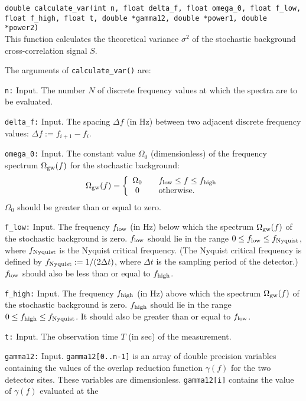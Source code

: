 {\tt double calculate\_var(int n, float delta\_f, float omega\_0, 
float f\_low, float f\_high, float t, double *gamma12, double *power1, 
double *power2)}\\
%
This function calculates the theoretical variance $\sigma^2$ of the 
stochastic background cross-correlation signal $S$.

The arguments of {\tt calculate\_var()} are:
\begin{description}
%
\item{\tt n:} Input. 
The number $N$ of discrete frequency values at which the spectra are
to be evaluated.
%
\item{\tt delta\_f:} Input.
The spacing $\Delta f$ (in Hz) between two adjacent discrete frequency
values: $\Delta f:=f_{i+1}-f_i$.  
%
\item{\tt omega\_0:} Input.  
The constant value $\Omega_0$ (dimensionless) of the frequency 
spectrum $\Omega_{\rm gw}(f)$ for the stochastic background:
%
\[
\Omega_{\rm gw}(f)=\left\{
\begin{array}{cl}
\Omega_0 & \quad f_{\rm low}\le f \le f_{\rm high}\\
0        & \quad {\rm otherwise.}
\end{array}
\right.
\]
%
$\Omega_0$ should be greater than or equal to zero.
%
\item{\tt f\_low:} Input.  
The frequency $f_{\rm low}$ (in Hz) below which the spectrum 
$\Omega_{\rm gw}(f)$ of the stochastic background is zero.
$f_{\rm low}$ should lie in the range $0\le f_{\rm low}\le f_{\rm Nyquist}$, 
where $f_{\rm Nyquist}$ is the Nyquist critical frequency. 
(The Nyquist critical frequency is defined by 
$f_{\rm Nyquist}:=1/(2\Delta t)$, 
where $\Delta t$ is the sampling period of the detector.)
$f_{\rm low}$ should also be less than or equal to $f_{\rm high}$.
%
\item{\tt f\_high:} Input.  
The frequency $f_{\rm high}$ (in Hz) above which the spectrum 
$\Omega_{\rm gw}(f)$ of the stochastic background is zero.
$f_{\rm high}$ should lie in the range $0\le f_{\rm high}\le f_{\rm Nyquist}$.
It should also be greater than or equal to $f_{\rm low}$.
%
\item{\tt t:} Input.
The observation time $T$ (in sec) of the measurement.
\item{\tt gamma12:} Input.  
{\tt gamma12[0..n-1]} is an array of double precision variables 
containing the values of the overlap reduction function $\gamma(f)$ 
for the two detector sites.
These variables are dimensionless.
{\tt gamma12[i]} contains the value of $\gamma(f)$ evaluated at the 

\end{description}
